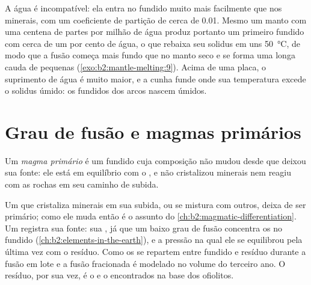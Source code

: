 A água é incompatível: ela entra no fundido muito mais facilmente que nos minerais,
com um coeficiente de partição de cerca de 0.01. Mesmo um manto com uma centena de
partes por milhão de água produz portanto um primeiro fundido com cerca de um por cento de
água, o que rebaixa seu solidus em uns \qty{50}{\celsius}, de modo que a fusão
começa mais fundo que no manto seco e se forma uma longa cauda de pequenas 
(\cref{exo:b2:mantle-melting:9}). Acima de uma placa, o suprimento de água é muito maior, e a cunha funde
onde sua temperatura excede o solidus úmido: os fundidos dos arcos nascem
úmidos.

\section{Grau de fusão e magmas primários}\label{sec:b2:mantle-melting:primary}

\begin{definition}\label{def:b2:mantle-melting:primary}
Um \emph{magma primário} é um fundido cuja composição não
mudou desde que deixou sua fonte: ele está em equilíbrio com o ,
e não cristalizou minerais nem reagiu com as rochas em seu caminho de subida.
\end{definition}

Um  que cristaliza minerais em sua subida, ou se mistura com outros, deixa de ser
primário; como ele muda então é o assunto do
\cref{ch:b2:magmatic-differentiation}. Um  registra sua fonte: sua
, já que um baixo grau de fusão concentra os 
no fundido (\cref{ch:b2:elements-in-the-earth}), e a pressão na qual ele se equilibrou
pela última vez com o resíduo. Como os  se repartem entre fundido e
resíduo durante a fusão em lote e a fusão fracionada é modelado no volume do terceiro ano. O
resíduo, por sua vez, é o  e o  encontrados na base dos
ofiolitos.

